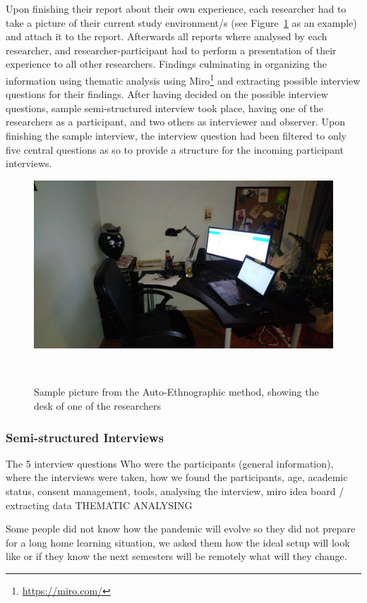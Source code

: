 \documentclass{sigchi}
\begin{document}
Upon finishing their report about their own experience, each researcher had to take a picture of their current study environment/s (see Figure~\ref{fig:figure1} as an example) and attach it to the report. Afterwards all reports where analysed by each researcher, and researcher-participant had to perform a presentation of their experience to all other researchers. Findings culminating in organizing the information using thematic analysis using Miro\footnote{\url{https://miro.com/}} and extracting possible interview questions for their findings. After having decided on the possible interview questions, sample semi-structured interview took place, having one of the researchers as a participant, and two others as interviewer and observer. Upon finishing the sample interview, the interview question had been filtered to only five central questions as so to provide a structure for the incoming participant interviews.
\begin{figure}
\centering
  \includegraphics[width=0.9\columnwidth]{figures/auto-e-picture}
  \caption{Sample picture from the Auto-Ethnographic method, showing the desk of one of the researchers}~\label{fig:figure1}
\end{figure}

\subsubsection{Semi-structured Interviews}
The 5 interview questions
Who were the participants (general information), where the interviews were taken, how we found the participants, age, academic status, consent management, tools, analysing the interview, miro idea board / extracting data THEMATIC ANALYSING 

Some people did not know how the pandemic will evolve so they did not prepare for a long home learning situation, we asked them how the ideal setup will look like or if they know the next semesters  will be remotely what will they change.
\end{document}
